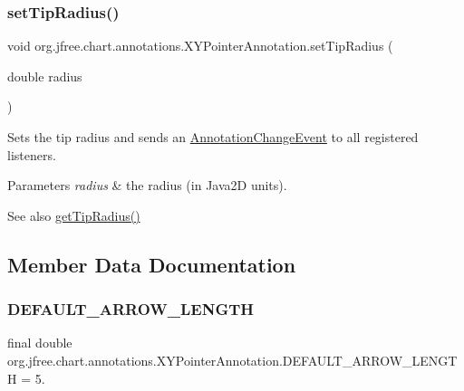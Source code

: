 \subsubsection{\texorpdfstring{set\+Tip\+Radius()}{setTipRadius()}}
{\footnotesize\ttfamily void org.\+jfree.\+chart.\+annotations.\+X\+Y\+Pointer\+Annotation.\+set\+Tip\+Radius (\begin{DoxyParamCaption}\item[{double}]{radius }\end{DoxyParamCaption})}

Sets the tip radius and sends an \mbox{\hyperlink{}{Annotation\+Change\+Event}} to all registered listeners.


\begin{DoxyParams}{Parameters}
{\em radius} & the radius (in Java2D units).\\
\hline
\end{DoxyParams}
\begin{DoxySeeAlso}{See also}
\mbox{\hyperlink{classorg_1_1jfree_1_1chart_1_1annotations_1_1_x_y_pointer_annotation_aad79a5c813eb31e69f2f7bad643ec70a}{get\+Tip\+Radius()}} 
\end{DoxySeeAlso}


\subsection{Member Data Documentation}
\mbox{\label{classorg_1_1jfree_1_1chart_1_1annotations_1_1_x_y_pointer_annotation_a31e319b723b99d78aa2763b5bac52b62}} 
\subsubsection{\texorpdfstring{D\+E\+F\+A\+U\+L\+T\+\_\+\+A\+R\+R\+O\+W\+\_\+\+L\+E\+N\+G\+TH}{DEFAULT\_ARROW\_LENGTH}}
{\footnotesize\ttfamily final double org.\+jfree.\+chart.\+annotations.\+X\+Y\+Pointer\+Annotation.\+D\+E\+F\+A\+U\+L\+T\+\_\+\+A\+R\+R\+O\+W\+\_\+\+L\+E\+N\+G\+TH = 5.\hspace{0.3cm}{\ttfamily [static]}}

